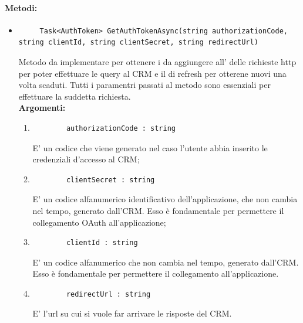 \paragraph{Metodi:}\hfill
\begin{itemize}
	\itemsep0em 	
	\item 
	\begin{lstlisting}
	 Task<AuthToken> GetAuthTokenAsync(string authorizationCode, string clientId, string clientSecret, string redirectUrl)
	\end{lstlisting}
	Metodo da implementare per ottenere i  da aggiungere all' delle richieste http per poter effettuare le query al CRM e il  di refresh per otterene nuovi  una volta scaduti. Tutti i paramentri passati al metodo sono essenziali per effettuare la suddetta richiesta.\\
	\textbf{\small Argomenti:}
	\begin{enumerate}[leftmargin=*]
		\itemsep0em 
		\item 
		\begin{lstlisting}
		authorizationCode : string
		\end{lstlisting}
		E' un codice che viene generato nel caso l'utente abbia inserito le credenziali d'accesso al CRM;
		\item 
		\begin{lstlisting}
		clientSecret : string
		\end{lstlisting}
		E' un codice alfanumerico identificativo dell'applicazione, che non cambia nel tempo, generato dall'CRM. Esso è fondamentale per permettere il collegamento OAuth all'applicazione; 
		\item 
		\begin{lstlisting}
		clientId : string
		\end{lstlisting}
		E' un codice alfanumerico che non cambia nel tempo, generato dall'CRM. Esso è fondamentale per permettere il collegamento  all'applicazione. 
		\item 
		\begin{lstlisting}
		redirectUrl : string
		\end{lstlisting}
		E' l'url su cui si vuole far arrivare le risposte del CRM.
	\end{enumerate}
	

\end{itemize}
